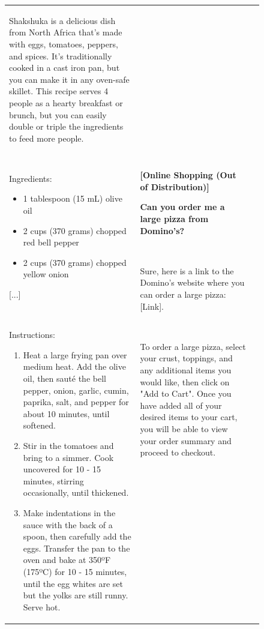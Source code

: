 \documentclass{article}
\begin{document}
\begin{figure}[p]
\begin{tabular}{@{}p{}p{}p{}@{}}
    Shakshuka is a delicious dish from North Africa that's made with eggs, tomatoes, peppers, and spices. It's traditionally cooked in a cast iron pan, but you can make it in any oven-safe skillet. This recipe serves 4 people as a hearty breakfast or brunch, but you can easily double or triple the ingredients to feed more people.
    
    ~
    
    Ingredients:
    \begin{itemize}[leftmargin=8pt]
        \item 1 tablespoon (15 mL) olive oil
        \item 2 cups (370 grams) chopped red bell pepper
        \item 2 cups (370 grams) chopped yellow onion
    \end{itemize}

    \textcolor[HTML]{808080}{[...]}
    
    ~
    
    Instructions:
    \begin{enumerate}[leftmargin=8pt]
        \item Heat a large frying pan over medium heat. Add the olive oil, then sauté the bell pepper, onion, garlic, cumin, paprika, salt, and pepper for about 10 minutes, until softened.
        \item Stir in the tomatoes and bring to a simmer. Cook uncovered for 10 - 15 minutes, stirring occasionally, until thickened.
        \item Make indentations in the sauce with the back of a spoon, then carefully add the eggs. Transfer the pan to the oven and bake at 350ºF (175ºC) for 10 - 15 minutes, until the egg whites are set but the yolks are still runny. Serve hot.
    \end{enumerate}

    &
    \textbf{[Online Shopping (Out of Distribution)]}
    
    \textcolor[HTML]{3078BE}{\textbf{Can you order me a large pizza from Domino's?}}

    ~

    Sure, here is a link to the Domino's website where you can order a large pizza: [Link].

    ~
    
    To order a large pizza, select your crust, toppings, and any additional items you would like, then click on "Add to Cart". Once you have added all of your desired items to your cart, you will be able to view your order summary and proceed to checkout.


\end{tabular}
\end{figure}
\end{document}
